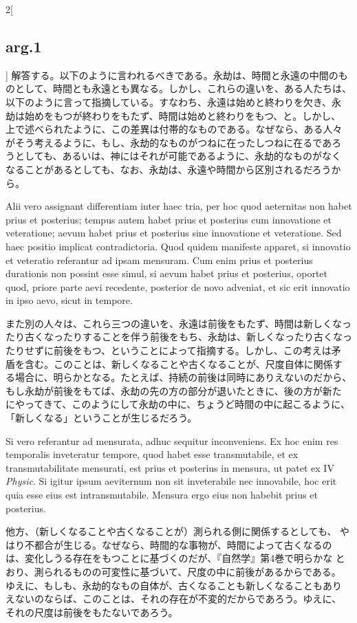 \documentclass[paper=a4paper,fontsize=10pt,jafontsize=9pt,titlepage]{jlreq}
\begin{document}
\begin{paracol}{2}[\subsection{arg.1}]
解答する。以下のように言われるべきである。永劫は、時間と永遠の中間のも
のとして、時間とも永遠とも異なる。しかし、これらの違いを、ある人たちは、
以下のように言って指摘している。すなわち、永遠は始めと終わりを欠き、永
劫は始めをもつが終わりをもたず、時間は始めと終わりをもつ、と。しかし、
上で述べられたように、この差異は付帯的なものである。なぜなら、ある人々
がそう考えるように、もし、永劫的なものがつねに在ったしつねに在るであろ
うとしても、あるいは、神にはそれが可能であるように、永劫的なものがなく
なることがあるとしても、なお、永劫は、永遠や時間から区別されるだろうか
ら。

\switchcolumn*

Alii vero assignant
differentiam inter haec tria, per hoc quod aeternitas non habet prius et
posterius; tempus autem habet prius et posterius cum innovatione et
veteratione; aevum habet prius et posterius sine innovatione et
veteratione. Sed haec positio implicat contradictoria. Quod quidem
manifeste apparet, si innovatio et veteratio referantur ad ipsam
mensuram. Cum enim prius et posterius durationis non possint esse simul,
si aevum habet prius et posterius, oportet quod, priore parte aevi
recedente, posterior de novo adveniat, et sic erit innovatio in ipso
aevo, sicut in tempore.

\switchcolumn

また別の人々は、これら三つの違いを、永遠は前後をもたず、時間は新しくなっ
たり古くなったりすることを伴う前後をもち、永劫は、新しくなったり古くなっ
たりせずに前後をもつ、ということによって指摘する。しかし、この考えは矛
盾を含む。このことは、新しくなることや古くなることが、尺度自体に関係す
る場合に、明らかとなる。たとえば、持続の前後は同時にありえないのだから、
もし永劫が前後をもてば、永劫の先の方の部分が退いたときに、後の方が新た
にやってきて、このようにして永劫の中に、ちょうど時間の中に起こるように、
「新しくなる」ということが生じるだろう。

\switchcolumn*

Si vero referantur ad mensurata, adhuc sequitur
inconveniens. Ex hoc enim res temporalis inveteratur tempore, quod habet
esse transmutabile, et ex transmutabilitate mensurati, est prius et
posterius in mensura, ut patet ex IV {\itshape Physic}. Si igitur ipsum aeviternum
non sit inveterabile nec innovabile, hoc erit quia esse eius est
intransmutabile. Mensura ergo eius non habebit prius et posterius.

\switchcolumn

他方、（新しくなることや古くなることが）測られる側に関係するとしても、
やはり不都合が生じる。なぜなら、時間的な事物が、時間によって古くなるの
は、変化しうる存在をもつことに基づくのだが、『自然学』第4巻で明らかな
とおり、測られるものの可変性に基づいて、尺度の中に前後があるからである。
ゆえに、もしも、永劫的なもの自体が、古くなることも新しくなることもあり
えないのならば、このことは、それの存在が不変的だからであろう。ゆえに、
それの尺度は前後をもたないであろう。


\end{paracol}
\end{document}
